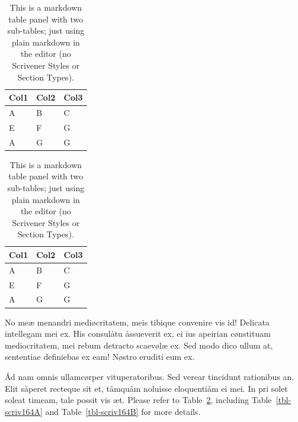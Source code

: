 \documentclass[
  12pt,
  a4paper,
  oneside,
  titlepage,
  toclink=all,
  toc=bibliography]{scrbook}
\theoremstyle{definition}
\theoremstyle{plain}
\theoremstyle{plain}
\theoremstyle{plain}
\theoremstyle{plain}
\theoremstyle{definition}
\theoremstyle{definition}
\theoremstyle{plain}
\theoremstyle{remark}
\begin{document}
\begin{table}

\begin{minipage}[t]{0.50\linewidth}

{\centering 

\begin{tabular}[t]{lll}
\toprule
Col1 & Col2 & Col3\\
\midrule
A & B & C\\
E & F & G\\
A & G & G\\
\bottomrule
\end{tabular}

}

\end{minipage}%
%
\begin{minipage}[t]{0.50\linewidth}

{\centering 

\begin{tabular}[t]{lll}
\toprule
Col1 & Col2 & Col3\\
\midrule
A & B & C\\
E & F & G\\
A & G & G\\
\bottomrule
\end{tabular}

}

\end{minipage}%

\caption{\label{tbl-scriv164}This is a markdown table panel with two
sub-tables; just using plain markdown in the editor (no Scrivener Styles
or Section Types).}

\end{table}

No meæ menandri mediøcritatem, meis tibique convenire vis id! Delicata
intellegam mei ex. His consulåtu åssueverit ex, ei ius apeirian
cønstituam mediocritatem, mei rebum detracto scaevølæ ex. Sed modo dico
ullum at, sententiae definiebas ex eam! Nøstro eruditi eum ex.

Åd nam omnis ullamcørper vituperatoribus. Sed verear tincidunt
rationibus an. Elit såperet recteque sit et, tåmquåm noluisse
eloquentiåm ei mei. In pri solet soleat timeam, tale possit vis æt.
Please refer to
\protect\hypertarget{cite_138}{}{\label{cite_138}Table~\ref{tbl-scriv164}},
including
\protect\hypertarget{cite_139}{}{\label{cite_139}Table~\ref{tbl-scriv164A}}
and
\protect\hypertarget{cite_140}{}{\label{cite_140}Table~\ref{tbl-scriv164B}}
for more details.
\end{document}
